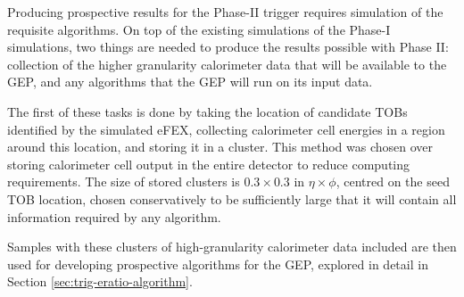 
Producing prospective results for the Phase-II trigger requires simulation of
the requisite algorithms. On top of the existing simulations of the Phase-I
simulations, two things are needed to produce the results possible with Phase
II: collection of the higher granularity calorimeter data that will be available
to the \ac{GEP}, and any algorithms that the \ac{GEP} will run on its input
data.

The first of these tasks is done by taking the location of \egamma candidate
\acp{TOB} identified by the simulated \ac{eFEX}, collecting calorimeter cell
energies in a region around this location, and storing it in a cluster. This
method was chosen over storing calorimeter cell output in the entire detector to
reduce computing requirements. The size of stored clusters is $0.3\times0.3$ in
$\eta\times\phi$, centred on the seed \ac{TOB} location, chosen conservatively
to be sufficiently large that it will contain all information required by any
algorithm.

Samples with these clusters of high-granularity calorimeter data included are
then used for developing prospective algorithms for the \ac{GEP}, explored in
detail in Section \ref{sec:trig-eratio-algorithm}.
